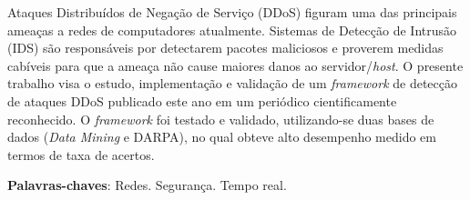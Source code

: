 \setlength{\absparsep}{18pt} %
\begin{resumo}[RESUMO]
      Ataques Distribuídos de Negação de Serviço (DDoS) figuram uma das principais ameaças a redes de computadores atualmente. Sistemas de Detecção de Intrusão (IDS) são responsáveis por detectarem pacotes maliciosos e proverem medidas cabíveis para que a ameaça não cause maiores danos ao servidor/\textit{host}. O presente trabalho visa o estudo, implementação e validação de um \textit{framework} de detecção de ataques DDoS publicado este ano em um periódico cientificamente reconhecido. O \textit{framework} foi testado e validado, utilizando-se duas bases de dados (\textit{Data Mining} e DARPA), no qual obteve alto desempenho medido em termos de taxa de acertos.
      
\textbf{Palavras-chaves}: Redes. Segurança. Tempo real.
\end{resumo}